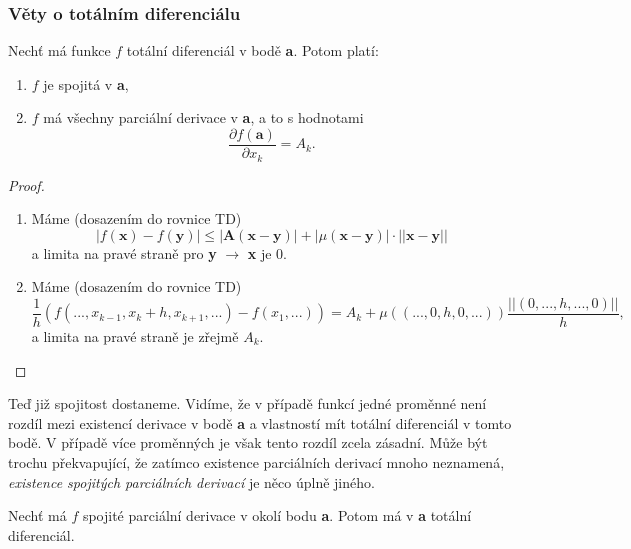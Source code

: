 \documentclass[../main.tex]{subfiles}
\begin{document}
\subsubsection{Věty o totálním diferenciálu}

\begin{lemma}\label{eq:satd}
	Nechť má funkce $f$ totální diferenciál v bodě \textbf{a}. Potom platí:
	\begin{enumerate}
	    \item $f$ je spojitá v \textbf{a},
	    \item $f$ má všechny parciální derivace v \textbf{a}, a to s hodnotami 
	    \[\frac{\partial f(\textbf{a})}{\partial x_k} = A_k.\]
	\end{enumerate}
\end{lemma}

\begin{proof}
	\begin{enumerate}
		\item Máme (dosazením do rovnice TD) \[|f(\textbf{x}) - f(\textbf{y})| \leq |\textbf{A}(\textbf{x}-\textbf{y})| + |\mu(\textbf{x}-\textbf{y})|\cdot||\textbf{x}-\textbf{y}||\]
		a limita na pravé straně pro \textbf{y} $\rightarrow$ \textbf{x} je 0.
		\item Máme (dosazením do rovnice TD) \[\frac{1}{h}(f(..., x_{k-1},x_k+h,x_{k+1},...) - f(x_1,...)) = A_k + \mu((...,0,h,0,...))\frac{||(0,...,h,...,0)||}{h},\]
		a limita na pravé straně je zřejmě $A_k$.
	\end{enumerate}
\end{proof}

Teď již spojitost dostaneme. Vidíme, že v případě funkcí jedné proměnné není rozdíl mezi existencí derivace v bodě \textbf{a} a vlastností
mít totální diferenciál v tomto bodě. V případě více proměnných je však tento rozdíl zcela zásadní. Může být trochu překvapující, že 
zatímco existence parciálních derivací mnoho neznamená, \textit{existence spojitých parciálních derivací} je něco úplně jiného.

\begin{theorem}
	Nechť má $f$ spojité parciální derivace v okolí bodu \textbf{a}. Potom má v \textbf{a} totální diferenciál.
\end{theorem}
\end{document}
